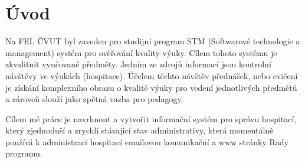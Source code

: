 \chapter{Úvod}

Na FEL ČVUT byl zaveden pro studijní program STM (Softwarové technologie a management) systém pro ověřování kvality výuky. Cílem tohoto systému je zkvalitnit vyučované předměty. Jedním ze zdrojů informací jsou kontrolní návštěvy ve výukách (hospitace). Účelem těchto návštěv přednášek, nebo cvičení je získání komplexního obrazu o kvalitě výuky pro vedení jednotlivých předmětů a zároveň slouží jako zpětná vazba pro pedagogy. 

Cílem mé práce je navrhnout a vytvořit informační systém pro správu hospitací, který zjednoduší a zrychlí stávající stav administrativy, která momentálně používá k administraci hospitací emailovou komunikační a www stránky Rady programu.
